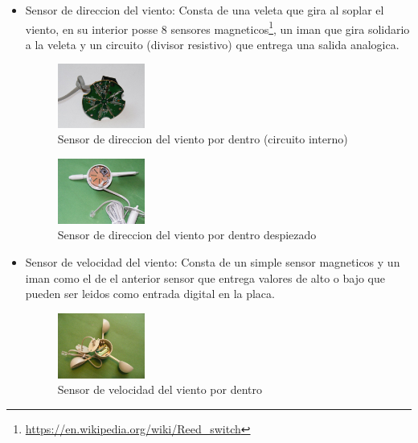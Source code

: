 \documentclass[10pt]{article}
\begin{document}
\begin{itemize}
   \item Sensor de direccion del viento: Consta de una veleta que gira al soplar el viento, en su interior posse 8 sensores magneticos\footnote{\url{https://en.wikipedia.org/wiki/Reed_switch}}, un iman que gira solidario a la veleta y un circuito (divisor resistivo) que entrega una salida analogica.
               \begin{figure}[H]
                  \centering
                  \includegraphics[width=0.27\textwidth]{./Images/winddir1.jpg}
                  \caption{Sensor de direccion del viento por dentro (circuito interno)}\label{fig:veleta_por_dentro}
               \end{figure}
               \begin{figure}[H]
                  \centering
                  \includegraphics[width=0.27\textwidth]{./Images/winddir2.jpg}
                  \caption{Sensor de direccion del viento por dentro despiezado}\label{fig:veleta_por_dentro2}
               \end{figure}
   \item Sensor de velocidad del viento: Consta de un simple sensor magneticos y un iman como el de el anterior sensor que entrega valores de alto o bajo que pueden ser leidos como entrada digital en la placa.
               \begin{figure}[H]
                  \centering
                  \includegraphics[width=0.27\textwidth]{./Images/windspeed1.jpg}
                  \caption{Sensor de velocidad del viento por dentro}\label{fig:anemometro}
               \end{figure}

\end{itemize}
\end{document}
